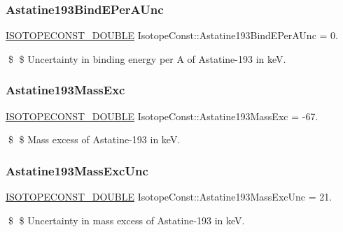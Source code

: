 \subsubsection{\texorpdfstring{Astatine193\+Bind\+E\+Per\+A\+Unc}{Astatine193BindEPerAUnc}}
{\footnotesize\ttfamily \mbox{\hyperlink{group___isotope_const-_macros_ga8f45a7272ce02c0b4c65c44636ed719a}{I\+S\+O\+T\+O\+P\+E\+C\+O\+N\+S\+T\+\_\+\+D\+O\+U\+B\+LE}} Isotope\+Const\+::\+Astatine193\+Bind\+E\+Per\+A\+Unc = 0.}

\$ \$ Uncertainty in binding energy per A of Astatine-\/193 in keV. \mbox{\label{group___isotope_const-_astatine-_at193_ga5b2e9b14b1988b27151381763813cfba}} 
\subsubsection{\texorpdfstring{Astatine193\+Mass\+Exc}{Astatine193MassExc}}
{\footnotesize\ttfamily \mbox{\hyperlink{group___isotope_const-_macros_ga8f45a7272ce02c0b4c65c44636ed719a}{I\+S\+O\+T\+O\+P\+E\+C\+O\+N\+S\+T\+\_\+\+D\+O\+U\+B\+LE}} Isotope\+Const\+::\+Astatine193\+Mass\+Exc = -\/67.}

\$ \$ Mass excess of Astatine-\/193 in keV. \mbox{\label{group___isotope_const-_astatine-_at193_ga1d665d2d941628954f633910761f3b50}} 
\subsubsection{\texorpdfstring{Astatine193\+Mass\+Exc\+Unc}{Astatine193MassExcUnc}}
{\footnotesize\ttfamily \mbox{\hyperlink{group___isotope_const-_macros_ga8f45a7272ce02c0b4c65c44636ed719a}{I\+S\+O\+T\+O\+P\+E\+C\+O\+N\+S\+T\+\_\+\+D\+O\+U\+B\+LE}} Isotope\+Const\+::\+Astatine193\+Mass\+Exc\+Unc = 21.}

\$ \$ Uncertainty in mass excess of Astatine-\/193 in keV. \mbox{\label{group___isotope_const-_astatine-_at193_gaaf86a3c0475a6f08fb553b487c3ecc03}} 
